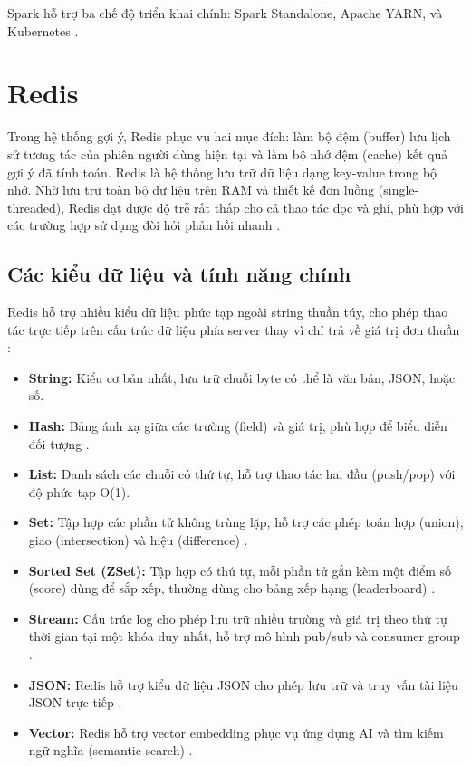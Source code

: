 \documentclass[../BTL.tex]{subfiles}
\begin{document}
Spark hỗ trợ ba chế độ triển khai chính: Spark Standalone, Apache YARN, và Kubernetes \cite{spark_official}.


\section{Redis}
Trong hệ thống gợi ý, Redis phục vụ hai mục đích: làm bộ đệm (buffer) lưu lịch sử tương tác của phiên người dùng hiện tại và làm bộ nhớ đệm (cache) kết quả gợi ý đã tính toán. Redis là hệ thống lưu trữ dữ liệu dạng key-value trong bộ nhớ. Nhờ lưu trữ toàn bộ dữ liệu trên RAM và thiết kế đơn luồng (single-threaded), Redis đạt được độ trễ rất thấp cho cả thao tác đọc và ghi, phù hợp với các trường hợp sử dụng đòi hỏi phản hồi nhanh \cite{redis_official,redis_wikipedia}.

\subsection{Các kiểu dữ liệu và tính năng chính}
Redis hỗ trợ nhiều kiểu dữ liệu phức tạp ngoài string thuần túy, cho phép thao tác trực tiếp trên cấu trúc dữ liệu phía server thay vì chỉ trả về giá trị đơn thuần \cite{redis_official,redis_definitive}:

\begin{itemize}
    \item \textbf{String:} Kiểu cơ bản nhất, lưu trữ chuỗi byte có thể là văn bản, JSON, hoặc số.

    \item \textbf{Hash:} Bảng ánh xạ giữa các trường (field) và giá trị, phù hợp để biểu diễn đối tượng \cite{redis_official}.

    \item \textbf{List:} Danh sách các chuỗi có thứ tự, hỗ trợ thao tác hai đầu (push/pop) với độ phức tạp O(1).

    \item \textbf{Set:} Tập hợp các phần tử không trùng lặp, hỗ trợ các phép toán hợp (union), giao (intersection) và hiệu (difference) \cite{redis_definitive}.

    \item \textbf{Sorted Set (ZSet):} Tập hợp có thứ tự, mỗi phần tử gắn kèm một điểm số (score) dùng để sắp xếp, thường dùng cho bảng xếp hạng (leaderboard) \cite{redis_official}.

    \item \textbf{Stream:} Cấu trúc log cho phép lưu trữ nhiều trường và giá trị theo thứ tự thời gian tại một khóa duy nhất, hỗ trợ mô hình pub/sub và consumer group \cite{redis_wikipedia,redis_official}.

    \item \textbf{JSON:} Redis hỗ trợ kiểu dữ liệu JSON cho phép lưu trữ và truy vấn tài liệu JSON trực tiếp \cite{redis_official}.

    \item \textbf{Vector:} Redis hỗ trợ vector embedding phục vụ ứng dụng AI và tìm kiếm ngữ nghĩa (semantic search) \cite{redis_official}.
\end{itemize}
\end{document}

